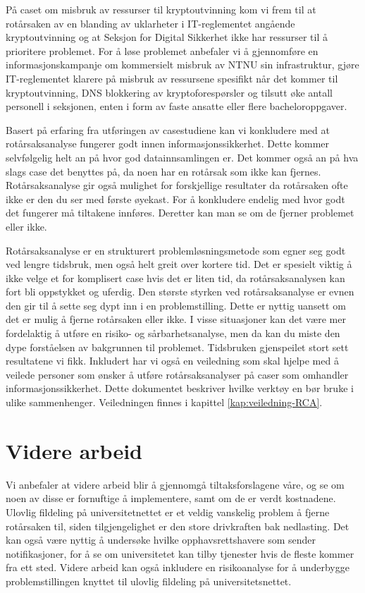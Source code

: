 \noindent På caset om misbruk av ressurser til kryptoutvinning kom vi frem til at rotårsaken av en blanding av uklarheter i IT-reglementet angående kryptoutvinning og at Seksjon for Digital Sikkerhet ikke har ressurser til å prioritere problemet. For å løse problemet anbefaler vi å gjennomføre en informasjonskampanje om kommersielt misbruk av NTNU sin infrastruktur, gjøre IT-reglementet klarere på misbruk av ressursene spesifikt når det kommer til kryptoutvinning, DNS blokkering av kryptoforespørsler og tilsutt øke antall personell i seksjonen, enten i form av faste ansatte eller flere bacheloroppgaver. 
\newline

\noindent Basert på erfaring fra utføringen av casestudiene kan vi konkludere med at rotårsaksanalyse fungerer godt innen informasjonssikkerhet. Dette kommer selvfølgelig helt an på hvor god datainnsamlingen er. Det kommer også an på hva slags case det benyttes på, da noen har en rotårsak som ikke kan fjernes. Rotårsaksanalyse gir også mulighet for forskjellige resultater da rotårsaken ofte ikke er den du ser med første øyekast. For å konkludere endelig med hvor godt det fungerer må tiltakene innføres. Deretter kan man se om de fjerner problemet eller ikke. 
\newline

\noindent Rotårsaksanalyse er en strukturert problemløsningsmetode som egner seg godt ved lengre tidsbruk, men også helt greit over kortere tid. Det er spesielt viktig å ikke velge et for komplisert case hvis det er liten tid, da rotårsaksanalysen kan fort bli oppstykket og uferdig. Den største styrken ved rotårsaksanalyse er evnen den gir til å sette seg dypt inn i en problemstilling. Dette er nyttig uansett om det er mulig å fjerne rotårsaken eller ikke. I visse situasjoner kan det være mer fordelaktig å utføre en risiko- og sårbarhetsanalyse, men da kan du miste den dype forståelsen av bakgrunnen til problemet. Tidsbruken gjenspeilet stort sett resultatene vi fikk. Inkludert har vi også en veiledning som skal hjelpe med å veilede personer som ønsker å utføre rotårsaksanalyser på caser som omhandler informasjonssikkerhet. Dette dokumentet beskriver hvilke verktøy en bør bruke i ulike sammenhenger. Veiledningen finnes i kapittel \ref{kap:veiledning-RCA}. 

\section{Videre arbeid}
Vi anbefaler at videre arbeid blir å gjennomgå tiltaksforslagene våre, og se om noen av disse er fornuftige å implementere, samt om de er verdt kostnadene. Ulovlig fildeling på universitetnettet er et veldig vanskelig problem å fjerne rotårsaken til, siden tilgjengelighet er den store drivkraften bak nedlasting. Det kan også være nyttig å undersøke hvilke opphavsrettshavere som sender notifikasjoner, for å se om universitetet kan tilby tjenester hvis de fleste kommer fra ett sted. Videre arbeid kan også inkludere en risikoanalyse for å underbygge problemstillingen knyttet til ulovlig fildeling på universitetsnettet. 

